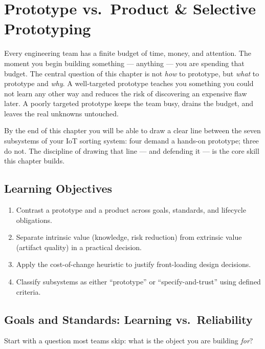 \chapter{Prototype vs.\ Product \& Selective Prototyping}
\label{ch3}

Every engineering team has a finite budget of time, money, and attention.
The moment you begin building something --- anything --- you are spending that
budget.
The central question of this chapter is not \emph{how} to prototype, but
\emph{what} to prototype and \emph{why}.
A well-targeted prototype teaches you something you could not learn any other
way and reduces the risk of discovering an expensive flaw later.
A poorly targeted prototype keeps the team busy, drains the budget, and leaves
the real unknowns untouched.

By the end of this chapter you will be able to draw a clear line between the
seven subsystems of your IoT sorting system: four demand a hands-on prototype;
three do not.
The discipline of drawing that line --- and defending it --- is the core skill
this chapter builds.

\section*{Learning Objectives}
\begin{enumerate}
  \item Contrast a prototype and a product across goals, standards, and
        lifecycle obligations.
  \item Separate intrinsic value (knowledge, risk reduction) from extrinsic
        value (artifact quality) in a practical decision.
  \item Apply the cost-of-change heuristic to justify front-loading design
        decisions.
  \item Classify subsystems as either ``prototype'' or ``specify-and-trust''
        using defined criteria.
\end{enumerate}

\section{Goals and Standards: Learning vs.\ Reliability}
\label{sec:ch3-goals-and-standards}

Start with a question most teams skip: what is the object you are building
\emph{for}?

